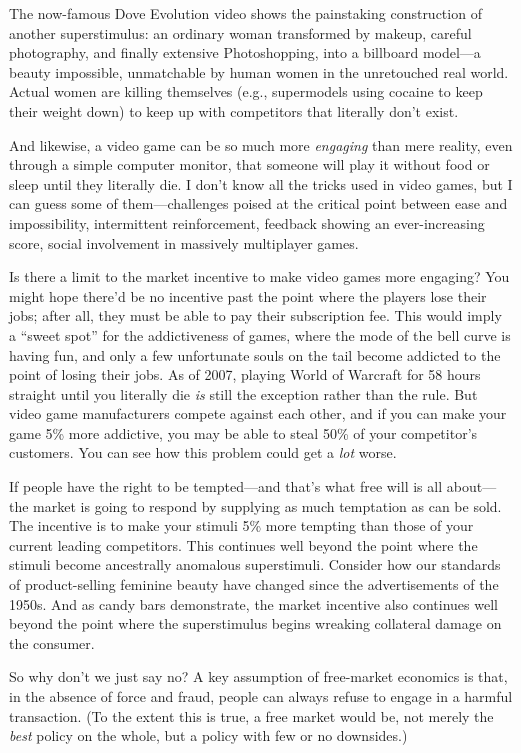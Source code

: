 {
 The now-famous Dove Evolution video shows the painstaking
construction of another superstimulus: an ordinary woman transformed by
makeup, careful photography, and finally extensive Photoshopping, into
a billboard model---a beauty impossible, unmatchable by human women in
the unretouched real world. Actual women are killing themselves (e.g.,
supermodels using cocaine to keep their weight down) to keep up with
competitors that literally don't exist.}

{
 And likewise, a video game can be so much more \textit{engaging}
than mere reality, even through a simple computer monitor, that someone
will play it without food or sleep until they literally die. I
don't know all the tricks used in video games, but I
can guess some of them---challenges poised at the critical point
between ease and impossibility, intermittent reinforcement, feedback
showing an ever-increasing score, social involvement in massively
multiplayer games.}

{
 Is there a limit to the market incentive to make video games more
engaging? You might hope there'd be no incentive past
the point where the players lose their jobs; after all, they must be
able to pay their subscription fee. This would imply a
``sweet spot'' for the addictiveness
of games, where the mode of the bell curve is having fun, and only a
few unfortunate souls on the tail become addicted to the point of
losing their jobs. As of 2007, playing World of Warcraft for 58 hours
straight until you literally die \textit{is} still the exception rather
than the rule. But video game manufacturers compete against each other,
and if you can make your game 5\% more addictive, you may be able to
steal 50\% of your competitor's customers. You can see
how this problem could get a \textit{lot} worse.}

{
 If people have the right to be tempted---and
that's what free will is all about---the market is
going to respond by supplying as much temptation as can be sold. The
incentive is to make your stimuli 5\% more tempting than those of your
current leading competitors. This continues well beyond the point where
the stimuli become ancestrally anomalous superstimuli. Consider how our
standards of product-selling feminine beauty have changed since the
advertisements of the 1950s. And as candy bars demonstrate, the market
incentive also continues well beyond the point where the superstimulus
begins wreaking collateral damage on the consumer.}

{
 So why don't we just say no? A key assumption of
free-market economics is that, in the absence of force and fraud,
people can always refuse to engage in a harmful transaction. (To the
extent this is true, a free market would be, not merely the
\textit{best} policy on the whole, but a policy with few or no
downsides.)}

